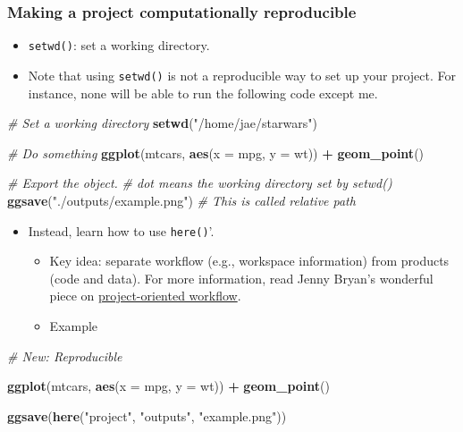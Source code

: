 \documentclass[
]{book}
\newenvironment{Shaded}{\begin{snugshade}}{\end{snugshade}}
\newcommand{\CommentTok}[1]{\textcolor[rgb]{0.56,0.35,0.01}{\textit{#1}}}
\newcommand{\DataTypeTok}[1]{\textcolor[rgb]{0.13,0.29,0.53}{#1}}
\newcommand{\KeywordTok}[1]{\textcolor[rgb]{0.13,0.29,0.53}{\textbf{#1}}}
\newcommand{\NormalTok}[1]{#1}
\newcommand{\OperatorTok}[1]{\textcolor[rgb]{0.81,0.36,0.00}{\textbf{#1}}}
\newcommand{\StringTok}[1]{\textcolor[rgb]{0.31,0.60,0.02}{#1}}
\begin{document}
\hypertarget{making-a-project-computationally-reproducible}{%
\subsubsection{Making a project computationally reproducible}\label{making-a-project-computationally-reproducible}}

\begin{itemize}
\item
  \texttt{setwd()}: set a working directory.
\item
  Note that using \texttt{setwd()} is not a reproducible way to set up your project. For instance, none will be able to run the following code except me.
\end{itemize}

\begin{Shaded}
\begin{Highlighting}[]
\CommentTok{\# Set a working directory }
\KeywordTok{setwd}\NormalTok{(}\StringTok{"/home/jae/starwars"}\NormalTok{)}

\CommentTok{\# Do something }
\KeywordTok{ggplot}\NormalTok{(mtcars, }\KeywordTok{aes}\NormalTok{(}\DataTypeTok{x =}\NormalTok{ mpg, }\DataTypeTok{y =}\NormalTok{ wt)) }\OperatorTok{+}
\StringTok{   }\KeywordTok{geom\_point}\NormalTok{()}

\CommentTok{\# Export the object. }
\CommentTok{\# dot means the working directory set by setwd()}
\KeywordTok{ggsave}\NormalTok{(}\StringTok{"./outputs/example.png"}\NormalTok{) }\CommentTok{\# This is called relative path }
\end{Highlighting}
\end{Shaded}

\begin{itemize}
\item
  Instead, learn how to use \texttt{here()}'.

  \begin{itemize}
  \item
    Key idea: separate workflow (e.g., workspace information) from products (code and data). For more information, read Jenny Bryan's wonderful piece on \href{https://www.tidyverse.org/blog/2017/12/workflow-vs-script/}{project-oriented workflow}.
  \item
    Example
  \end{itemize}
\end{itemize}

\begin{Shaded}
\begin{Highlighting}[]
\CommentTok{\# New: Reproducible }

\KeywordTok{ggplot}\NormalTok{(mtcars, }\KeywordTok{aes}\NormalTok{(}\DataTypeTok{x =}\NormalTok{ mpg, }\DataTypeTok{y =}\NormalTok{ wt)) }\OperatorTok{+}
\StringTok{   }\KeywordTok{geom\_point}\NormalTok{()}

\KeywordTok{ggsave}\NormalTok{(}\KeywordTok{here}\NormalTok{(}\StringTok{"project"}\NormalTok{, }\StringTok{"outputs"}\NormalTok{, }\StringTok{"example.png"}\NormalTok{))}
\end{Highlighting}
\end{Shaded}
\end{document}
